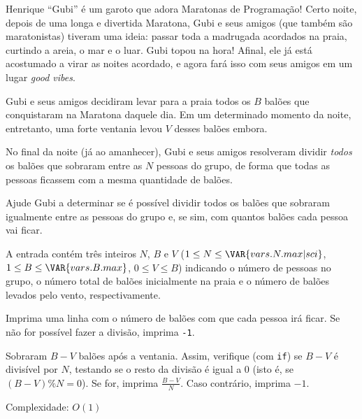 Henrique ``Gubi'' é um garoto que adora Maratonas de Programação! Certo noite, depois de uma longa e divertida Maratona, Gubi e seus amigos (que também são maratonistas) tiveram uma ideia: passar toda a madrugada acordados na praia, curtindo a areia, o mar e o luar.  Gubi topou na hora! Afinal, ele já está acostumado a virar as noites acordado, e agora fará isso com seus amigos em um lugar \textit{good vibes}.

Gubi e seus amigos decidiram levar para a praia todos os $B$ balões que conquistaram na Maratona daquele dia. Em um determinado momento da noite, entretanto, uma forte ventania levou $V$ desses balões embora.

No final da noite (já ao amanhecer), Gubi e seus amigos resolveram dividir \textit{todos} os balões que sobraram entre as $N$ pessoas do grupo, de forma que todas as pessoas ficassem com a mesma quantidade de balões.

Ajude Gubi a determinar se é possível dividir todos os balões que sobraram igualmente entre as pessoas do grupo e, se sim, com quantos balões cada pessoa vai ficar.


A entrada contém três inteiros $N$, $B$ e $V$
($1 \leq N \leq \VAR{vars.N.max | sci}$, $1 \leq B \leq \VAR{vars.B.max}$, $0 \leq V \leq B$)
indicando o número de pessoas no grupo, o número total de balões inicialmente na
praia e o número de balões levados pelo vento, respectivamente.

Imprima uma linha com o número de balões com que cada pessoa irá ficar. Se não
for possível fazer a divisão, imprima \texttt{-1}.

Sobraram $B-V$ balões após a ventania. Assim, verifique (com \texttt{if}) se
$B-V$ é divisível por $N$, testando se o resto da divisão é igual a 0 (isto é,
        se $(B-V) \% N = 0$). Se for, imprima $\displaystyle\frac{B-V}{N}$. Caso contrário,
        imprima $-1$.

Complexidade: $O(1)$
